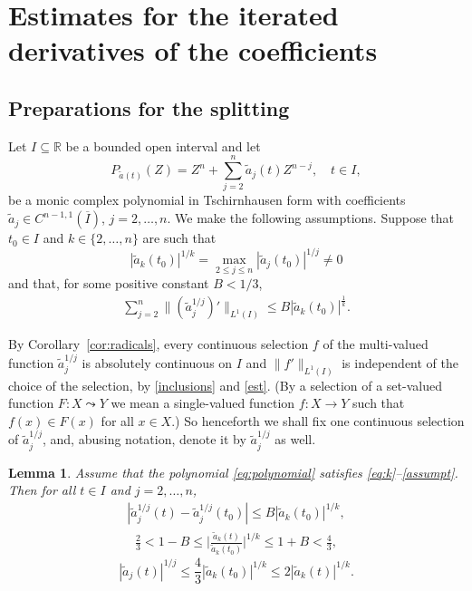 \documentclass[12pt]{amsart}
\theoremstyle{plain}
\newtheorem{lemma}{Lemma}
\theoremstyle{definition}
\numberwithin{equation}{section}
\begin{document}
\section{Estimates for the iterated derivatives of the coefficients} \label{aestimates}

\subsection{Preparations for the splitting}

Let $I\subseteq {\mathbb{R}}$ be a bounded open interval and let 
\begin{equation} \label{eq:polynomial}
  P_{\tilde a(t)}(Z) = Z^n + \sum_{j=2}^n \tilde a_j(t) Z^{n-j},\quad t \in I,    
\end{equation} 
be a monic complex polynomial in Tschirnhausen form with coefficients $\tilde a_j \in C^{n-1,1}( {\overline I} )$, $j = 2,\ldots,n$.
We make the following assumptions.
Suppose that $t_0\in I$ and $k \in \{2,\dots,n\}$ are such that 
\begin{equation} \label{eq:k}
  |\tilde a_k(t_0)|^{1/k} =  \max_{2 \le j\le n} |\tilde a_j(t_0)|^{1/j}\ne 0  
 \end{equation} 
and that, for some positive constant $B<  1/3$,  
\begin{align}\label{assumpt}
\sum_{j=2}^n \|(\tilde a_j^{1/j})'\|_{L^1 (I)} \le  B |\tilde a_k(t_0)|^\frac{1}{k} .
\end{align}

By Corollary~\ref{cor:radicals}, 
every continuous selection $f$ of 
the multi-valued function $\tilde a_j^{1/j}$ is absolutely continuous on $I$ and $\|f'\|_{L^1(I)}$ is independent of the 
choice of the selection, by \eqref{inclusions} and \eqref{est}. 
(By a selection of a set-valued function $F : X \leadsto Y$ we mean a single-valued function $f : X \to Y$ such that $f(x) \in F(x)$ 
for all $x \in X$.)
So henceforth we shall fix one continuous selection of $\tilde a_j^{1/j}$, and, abusing notation, denote it by $\tilde a_j^{1/j}$ as well.

\begin{lemma} \label{lem1}
  Assume that the polynomial \eqref{eq:polynomial} satisfies \eqref{eq:k}--\eqref{assumpt}. Then for all $t \in I$ and $j=2,\ldots,n$,
  \begin{align} \label{eq:ass10} 
    |\tilde a_j^{1/j} (t) - \tilde a_j^{1/j} (t_0)| \le  B |\tilde a_k (t_0)|^{1/k},  
  \end{align}
  \begin{align} \label{eq:ass11}  
    \frac 2 3 <    1-B \le \Big | \frac{\tilde a_k(t)}{\tilde a_k(t_0)} \Big |^{1/k}   \le 1+B < \frac4 3,  
  \end{align}
  \begin{equation} \label{eq:ass12}
    |\tilde a_j(t)|^{1/j}\le \frac 4 3 |\tilde a_k(t_0)|^{1/k} \le  2  |\tilde a_k(t)|^{1/k}.
  \end{equation}
\end{lemma}
\end{document}
